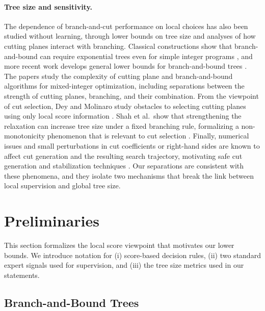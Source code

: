 \documentclass[smallextended,envcountsect]{svjour3} %
\newcommand{\0}{\mathbf{0}}
\newcommand{\1}{\mathbf{1}} %
\begin{document}
\paragraph{Tree size and sensitivity.}
The dependence of branch-and-cut performance on local choices has also been studied without learning, through lower bounds on tree size and analyses of how cutting planes interact with branching.
Classical constructions show that branch-and-bound can require exponential trees even for simple integer programs \citep{jeroslow1974trivial}, and more recent work develops general lower bounds for branch-and-bound trees \citep{dey2023lowerbounds}.
The papers \citep{basu2020complexity,basu-BB-CP-II} study the complexity of cutting plane and branch-and-bound algorithms for mixed-integer optimization, including separations between the strength of cutting planes, branching, and their combination.
From the viewpoint of cut selection, Dey and Molinaro study obstacles to selecting cutting planes using only local score information \citep{deyMolinaro2018cuttingPlaneSelection}.
Shah et al.\ show that strengthening the relaxation can increase tree size under a fixed branching rule, formalizing a non-monotonicity phenomenon that is relevant to cut selection \citep{shah2025non}.
Finally, numerical issues and small perturbations in cut coefficients or right-hand sides are known to affect cut generation and the resulting search trajectory, motivating safe cut generation and stabilization techniques \citep{cook2009numerically,cornuejols2013safety,achterberg2009scip}.
Our separations are consistent with these phenomena, and they isolate two mechanisms that break the link between local supervision and global tree size.



\section{Preliminaries}\label{sec:prelim}

This section formalizes the local score viewpoint that motivates our lower bounds.
We introduce notation for (i) score-based decision rules, (ii) two standard expert signals used for supervision, and (iii) the tree size metrics used in our statements.

\subsection{Branch-and-Bound Trees}
\end{document}
